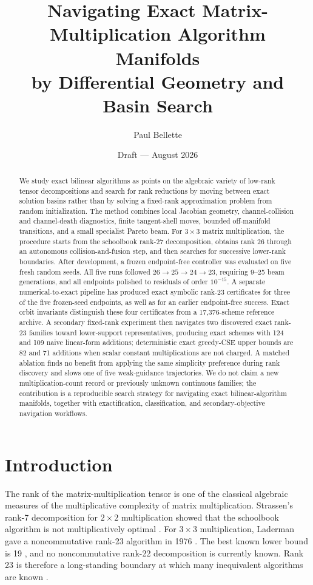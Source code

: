 \documentclass[11pt]{article}
\title{Navigating Exact Matrix-Multiplication Algorithm Manifolds\\
by Differential Geometry and Basin Search}
\author{Paul Bellette}
\date{Draft --- August 2026}
\begin{document}
\maketitle

\begin{abstract}
We study exact bilinear algorithms as points on the algebraic variety of low-rank tensor decompositions and search for rank reductions by moving between exact solution basins rather than by solving a fixed-rank approximation problem from random initialization.  The method combines local Jacobian geometry, channel-collision and channel-death diagnostics, finite tangent-shell moves, bounded off-manifold transitions, and a small specialist Pareto beam.  For $3\times3$ matrix multiplication, the procedure starts from the schoolbook rank-27 decomposition, obtains rank 26 through an autonomous collision-and-fusion step, and then searches for successive lower-rank boundaries.  After development, a frozen endpoint-free controller was evaluated on five fresh random seeds.  All five runs followed $26\to25\to24\to23$, requiring 9--25 beam generations, and all endpoints polished to residuals of order $10^{-15}$.  A separate numerical-to-exact pipeline has produced exact symbolic rank-23 certificates for three of the five frozen-seed endpoints, as well as for an earlier endpoint-free success.  Exact orbit invariants distinguish these four certificates from a 17,376-scheme reference archive. A secondary fixed-rank experiment then navigates two discovered exact rank-23 families toward lower-support representatives, producing exact schemes with 124 and 109 naive linear-form additions; deterministic exact greedy-CSE upper bounds are 82 and 71 additions when scalar constant multiplications are not charged. A matched ablation finds no benefit from applying the same simplicity preference during rank discovery and slows one of five weak-guidance trajectories. We do not claim a new multiplication-count record or previously unknown continuous families; the contribution is a reproducible search strategy for navigating exact bilinear-algorithm manifolds, together with exactification, classification, and secondary-objective navigation workflows.
\end{abstract}

\section{Introduction}

The rank of the matrix-multiplication tensor is one of the classical algebraic measures of the multiplicative complexity of matrix multiplication.  Strassen's rank-7 decomposition for $2\times2$ multiplication showed that the schoolbook algorithm is not multiplicatively optimal \cite{strassen1969}.  For $3\times3$ multiplication, Laderman gave a noncommutative rank-23 algorithm in 1976 \cite{laderman1976}.  The best known lower bound is 19 \cite{blaser2003}, and no noncommutative rank-22 decomposition is currently known.  Rank 23 is therefore a long-standing boundary at which many inequivalent algorithms are known \cite{heule2021,ballard2019}.
\end{document}

